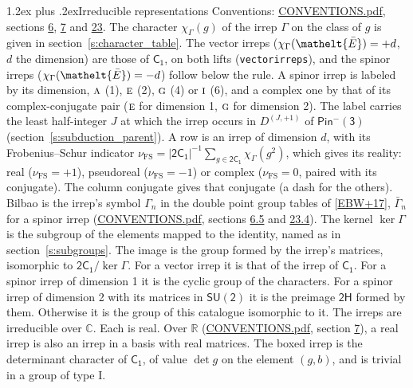 \documentclass[10pt,a4paper]{article}
\makeatletter
\renewcommand\section{\@startsection{section}{1}{\z@}{-3ex plus -1ex minus -.2ex}%
  {1.2ex plus .2ex}{\normalfont\large\sffamily\bfseries\color{parttitle}}}
\numberwithin{equation}{section}
\newcommand{\eltfont}[1]{{\let\sigma\eltsigma\mathelt{#1}}}
\newcommand{\grp}[1]{\mathsf{#1}}
\newcommand{\irr}[1]{\text{\normalfont\scshape #1}}
\newcommand{\elt}[1]{\eltfont{#1}}
\newcommand{\irrJp}[2]{D^{(#1,#2)}}
\newcommand{\irchar}[1]{\chi_{#1}}
\newcommand{\fsind}{\nu_{\mathrm{FS}}}
\newcommand{\barred}[1]{\bar{#1}}
\makeatother
\begin{document}
\section{Irreducible representations}\label{s:irreps}
Conventions: \href{../../CONVENTIONS.pdf}{CONVENTIONS.pdf}, sections \href{../../../rotation/CONVENTIONS.pdf\#conv.6}{6}, \href{../../../rotation/CONVENTIONS.pdf\#conv.7}{7} and \href{../../CONVENTIONS.pdf\#conv.23}{23}.
\leavevmode\label{n:function.character}\label{n:irrep.Gamma}The character $\irchar{\Gamma}(g)$ of the irrep $\Gamma$ on the class of $g$ is given in section~\ref{s:character_table}. \label{n:index.dimension}The vector irreps ($\irchar{\Gamma}(\elt{\barred{E}}) = +d$, $d$ the dimension) are those of \href{../../../rotation/data/pdf/C1.pdf}{$\grp{C_{1}}$}, on both lifts (\texttt{vectorirreps}), and the spinor irreps ($\irchar{\Gamma}(\elt{\barred{E}}) = -d$) follow below the rule. A spinor irrep is labeled by its dimension, $\irr{a}$ (1), $\irr{e}$ (2), $\irr{g}$ (4) or $\irr{i}$ (6), and a complex one by that of its complex-conjugate pair ($\irr{e}$ for dimension 1, $\irr{g}$ for dimension 2). The label carries the least half-integer $J$ at which the irrep occurs in $\irrJp{J}{+1}$ of $\grp{Pin^{-}(3)}$ (section~\ref{s:subduction_parent}).
\leavevmode\label{n:index.frobenius}\label{n:head.irrep}\label{n:head.reality}A row is an irrep of dimension $d$, with its Frobenius--Schur indicator $\fsind = |\grp{2C_{1}}|^{-1}\allowbreak\sum_{g\in\grp{2C_{1}}}\irchar{\Gamma}(g^2)$, which gives its reality: real ($\fsind = +1$), pseudoreal ($\fsind = -1$) or complex ($\fsind = 0$, paired with its conjugate). \label{n:head.conjugate}The column conjugate gives that conjugate (a dash for the others). \label{n:head.bilbao}\label{n:irrep.alias.gamma}Bilbao is the irrep's symbol $\Gamma_n$ in the double point group tables of [\href{../../../REFERENCES.pdf\#ref.EBW+17}{EBW+17}], $\bar{\Gamma}_n$ for a spinor irrep (\href{../../CONVENTIONS.pdf}{CONVENTIONS.pdf}, sections \href{../../../rotation/CONVENTIONS.pdf\#conv.6.5}{6.5} and \href{../../CONVENTIONS.pdf\#conv.23.4}{23.4}). \label{n:head.kernel}The kernel $\ker\Gamma$ is the subgroup of the elements mapped to the identity, named as in section~\ref{s:subgroups}. \label{n:head.image}The image is the group formed by the irrep's matrices, isomorphic to $\grp{2C_{1}}/\ker\Gamma$. For a vector irrep it is that of the irrep of \href{../../../rotation/data/pdf/C1.pdf}{$\grp{C_{1}}$}. For a spinor irrep of dimension 1 it is the cyclic group of the characters. For a spinor irrep of dimension 2 with its matrices in $\grp{SU(2)}$ it is the preimage $\grp{2H}$ formed by them. Otherwise it is the group of this catalogue isomorphic to it. The irreps are irreducible over $\mathbb{C}$. Each is real. Over $\mathbb{R}$ (\href{../../CONVENTIONS.pdf}{CONVENTIONS.pdf}, section \href{../../../rotation/CONVENTIONS.pdf\#conv.7}{7}), a real irrep is also an irrep in a basis with real matrices. \label{n:mark.determinant}The boxed irrep is the determinant character of \href{../../../rotation/data/pdf/C1.pdf}{$\grp{C_{1}}$}, of value $\det g$ on the element $(g, b)$, and is trivial in a group of type I.
\end{document}
